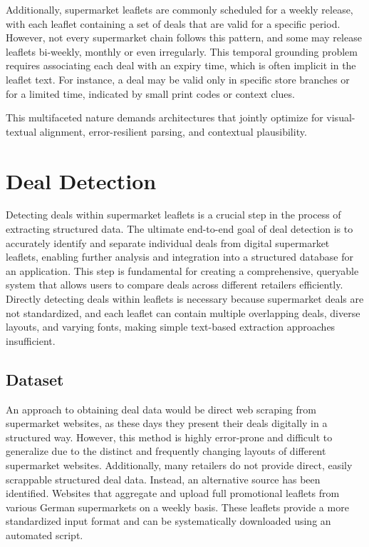 \documentclass[11pt]{article}
\begin{document}
Additionally, supermarket leaflets are commonly scheduled for a weekly release, with each leaflet containing a set of deals that are valid for a specific period. However, not every supermarket chain follows this pattern, and some may release leaflets bi-weekly, monthly or even irregularly. This temporal grounding problem requires associating each deal with an expiry time, which is often implicit in the leaflet text. For instance, a deal may be valid only in specific store branches or for a limited time, indicated by small print codes or context clues.

This multifaceted nature demands architectures that jointly optimize for visual-textual alignment, error-resilient parsing, and contextual plausibility.

\section{Deal Detection}
Detecting deals within supermarket leaflets is a crucial step in the process of extracting structured  data. The ultimate end-to-end goal of deal detection is to accurately identify and separate individual deals from digital supermarket leaflets, enabling further analysis and integration into a structured database for an application. This step is fundamental for creating a comprehensive, queryable system that allows users to compare deals across different retailers efficiently. Directly detecting deals within leaflets is necessary because supermarket deals are not standardized, and each leaflet can contain multiple overlapping deals, diverse layouts, and varying fonts, making simple text-based extraction approaches insufficient.

\subsection{Dataset}
An approach to obtaining deal data would be direct web scraping from supermarket websites, as these days they present their deals digitally in a structured way. However, this method is highly error-prone and difficult to generalize due to the distinct and frequently changing layouts of different supermarket websites. Additionally, many retailers do not provide direct, easily scrappable structured deal data. Instead, an alternative source has been identified. Websites that aggregate and upload full promotional leaflets from various German supermarkets on a weekly basis. These leaflets provide a more standardized input format and can be systematically downloaded using an automated script.
\end{document}

